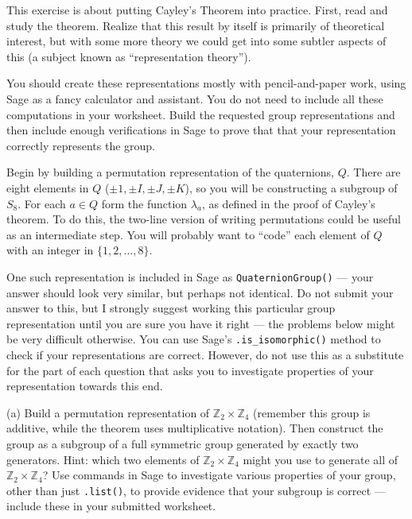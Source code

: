 \begin{sageverbatim}\end{sageverbatim}
%
%
This exercise is about putting Cayley's Theorem into practice.  First, read and study the theorem.  Realize that this result by itself is primarily of theoretical interest, but with some more theory we could get into some subtler aspects of this (a subject known as ``representation theory'').\par
%
You should create these representations mostly with pencil-and-paper work, using Sage as a fancy calculator and assistant.  You do not need to include all these computations in your worksheet.  Build the requested group representations and then include enough verifications in Sage to prove that that your representation correctly represents the group.\par
%
Begin by building a permutation representation of the quaternions, $Q$.  There are eight elements in $Q$ ($\pm 1, \pm I, \pm J, \pm K$), so you will be constructing a subgroup of $S_8$.  For each $a\in Q$ form the function $\lambda_a$, as defined in the proof of Cayley's theorem.  To do this, the two-line version of writing permutations could be useful as an intermediate step.  You will probably want to ``code'' each element of $Q$ with an integer in $\{1,2,\dots,8\}$.\par
%
One such representation is included in Sage as \verb?QuaternionGroup()? --- your answer should look very similar, but perhaps not identical.  Do not submit your answer to this, but I strongly suggest working this particular group representation until you are sure you have it right --- the problems below might be very difficult otherwise.  You can use Sage's \verb?.is_isomorphic()? method to check if your representations are correct.  However, do not use this as a substitute for the part of each question that asks you to investigate properties of your representation towards this end.\par
%
(a) Build a permutation representation of ${\mathbb Z}_2\times{\mathbb Z}_4$ (remember this group is additive, while the theorem uses multiplicative notation).  Then construct the group as a subgroup of a full symmetric group generated by exactly two generators.  Hint: which two elements of ${\mathbb Z}_2\times{\mathbb Z}_4$ might you use to generate all of ${\mathbb Z}_2\times{\mathbb Z}_4$?  Use commands in Sage to investigate various properties of your group, other than just \verb?.list()?, to provide evidence that your subgroup is correct --- include these in your submitted worksheet.\par

